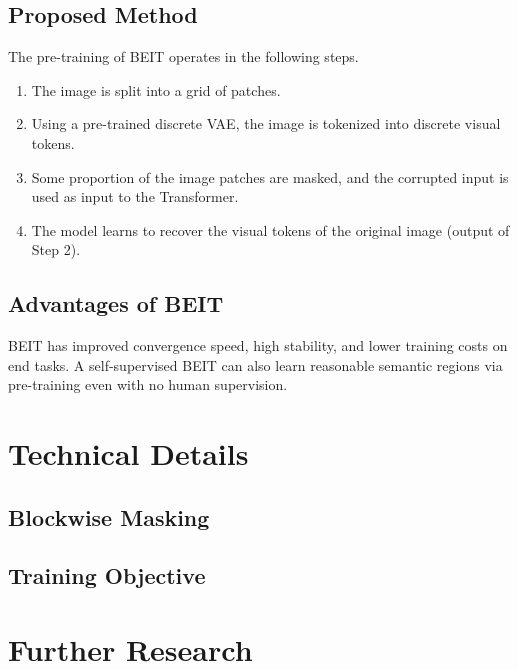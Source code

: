 \documentclass[10pt,twocolumn,letterpaper]{article}
\begin{document}
\subsection{Proposed Method}
The pre-training of BEIT operates in the following steps.
\begin{enumerate}
    \item{The image is split into a grid of patches.}
    \item{Using a pre-trained discrete VAE, the image is tokenized into discrete visual tokens.}
    \item{Some proportion of the image patches are masked, and the corrupted input is used as input to the Transformer.}
    \item{The model learns to recover the visual tokens of the original image (output of Step 2).}
\end{enumerate}

\subsection{Advantages of BEIT}
BEIT has improved convergence speed, high stability, and lower training costs on end tasks.
A self-supervised BEIT can also learn reasonable semantic regions via pre-training even with
no human supervision.

\section{Technical Details}
\subsection{Blockwise Masking}
\subsection{Training Objective}
\section{Further Research}

{\small   }
\end{document}
